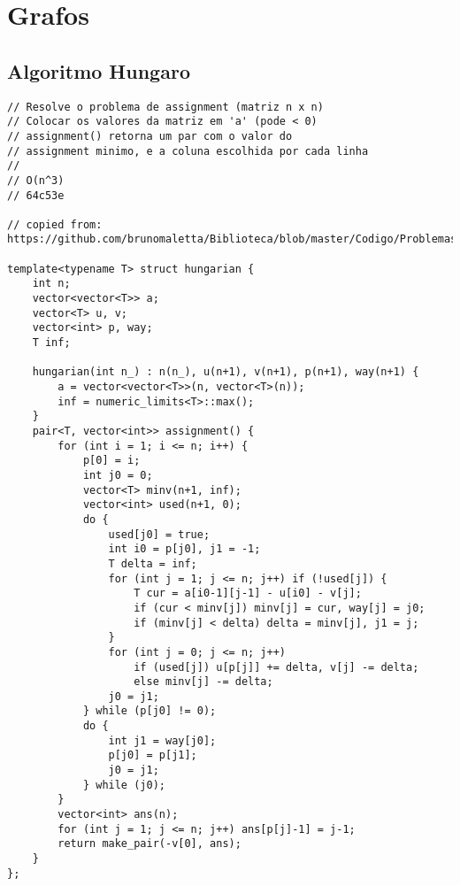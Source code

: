 \documentclass[12pt, a4paper, twoside]{article}
\begin{document}
\section{Grafos}

\subsection{Algoritmo Hungaro
}
\begin{lstlisting}
// Resolve o problema de assignment (matriz n x n)
// Colocar os valores da matriz em 'a' (pode < 0)
// assignment() retorna um par com o valor do
// assignment minimo, e a coluna escolhida por cada linha
//
// O(n^3)
// 64c53e

// copied from: https://github.com/brunomaletta/Biblioteca/blob/master/Codigo/Problemas/hungarian.cpp

template<typename T> struct hungarian {
	int n;
	vector<vector<T>> a;
	vector<T> u, v;
	vector<int> p, way;
	T inf;

	hungarian(int n_) : n(n_), u(n+1), v(n+1), p(n+1), way(n+1) {
		a = vector<vector<T>>(n, vector<T>(n));
		inf = numeric_limits<T>::max();
	}
	pair<T, vector<int>> assignment() {
		for (int i = 1; i <= n; i++) {
			p[0] = i;
			int j0 = 0;
			vector<T> minv(n+1, inf);
			vector<int> used(n+1, 0);
			do {
				used[j0] = true;
				int i0 = p[j0], j1 = -1;
				T delta = inf;
				for (int j = 1; j <= n; j++) if (!used[j]) {
					T cur = a[i0-1][j-1] - u[i0] - v[j];
					if (cur < minv[j]) minv[j] = cur, way[j] = j0;
					if (minv[j] < delta) delta = minv[j], j1 = j;
				}
				for (int j = 0; j <= n; j++)
					if (used[j]) u[p[j]] += delta, v[j] -= delta;
					else minv[j] -= delta;
				j0 = j1;
			} while (p[j0] != 0);
			do {
				int j1 = way[j0];
				p[j0] = p[j1];
				j0 = j1;
			} while (j0);
		}
		vector<int> ans(n);
		for (int j = 1; j <= n; j++) ans[p[j]-1] = j-1;
		return make_pair(-v[0], ans);
	}
};
\end{lstlisting}
\end{document}
